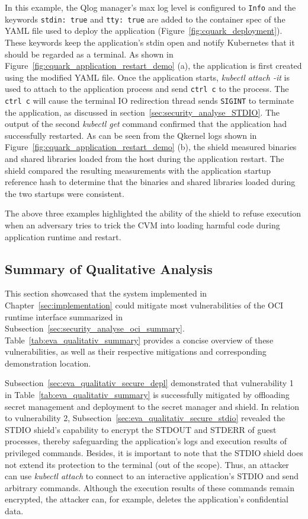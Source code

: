 In this example, the Qlog manager’s max log level is configured to \texttt{Info} and the keywords \texttt{stdin: true} and \texttt{tty: true} are added to the container spec of the YAML file used to deploy the 
application (Figure~\ref{fig:cquark_deployment}). These keywords keep the application’s stdin open and notify Kubernetes\cite*{k8s} that it should be regarded as a terminal. As shown in Figure~\ref{fig:cquark_application_restart_demo} (a), the application is first created using the modified YAML file. Once the application starts, \emph{kubectl attach -it} is used to 
attach to the application process and send \texttt{ctrl c} to the process. The \texttt{ctrl c} will cause the terminal IO redirection thread sends \texttt{SIGINT} to terminate the application, as discussed in section~\ref{sec:security_analyse_STDIO}. The output of the second \emph{kubectl get} command confirmed that the application had successfully restarted. 
As can be seen from the Qkernel logs shown in Figure~\ref{fig:cquark_application_restart_demo} (b), the shield measured binaries and shared libraries loaded from the host during the application restart. The shield compared the resulting measurements with the application startup reference hash to determine that the binaries and shared libraries loaded during 
the two startups were consistent.


The above three examples highlighted the ability of the shield to refuse execution when an adversary tries to trick the \acrshort{CVM} into loading harmful code during application runtime and restart. 


\subsection{Summary of Qualitative Analysis}
\label{sec:eva_qualitativ_summary}




This section showcased that the system implemented in Chapter~\ref{sec:implementation} could mitigate most vulnerabilities of the OCI runtime interface summarized in Subsection~\ref{sec:security_analyse_oci_summary}. Table~\ref{tab:eva_qualitativ_summary} provides a concise overview of 
these vulnerabilities, as well as their respective mitigations and corresponding demonstration location.

Subsection~\ref{sec:eva_qualitativ_secure_depl} demonstrated that vulnerability 1 in Table~\ref{tab:eva_qualitativ_summary} is successfully mitigated by offloading secret management and deployment to the secret manager and shield. In relation to vulnerability 2, 
Subsection~\ref{sec:eva_qualitativ_secure_stdio} revealed the STDIO shield's capability to encrypt the STDOUT and STDERR of guest processes, thereby safeguarding the application's logs and execution results of privileged commands. Besides, it is important to note that the STDIO 
shield does not extend its protection to the terminal (out of the scope). Thus, an attacker can use \emph{kubectl attach} to connect to an interactive application's STDIO and send arbitrary commands. Although the execution results of these commands remain encrypted, 
the attacker can, for example, deletes the application's confidential data. 


